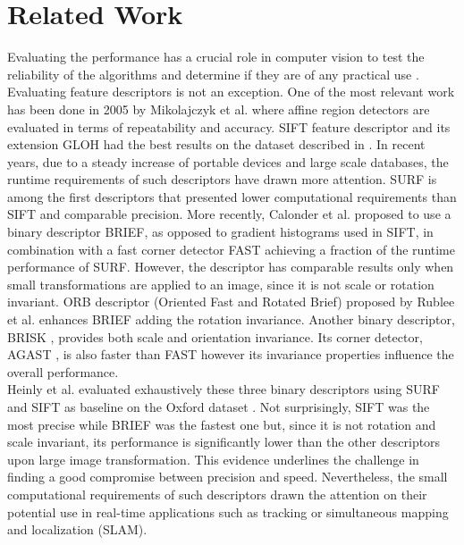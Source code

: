 \section{Related Work}
\label{sec:relatedwork}

Evaluating the performance has a crucial role in computer vision to test the reliability of the algorithms and determine if they are of any practical use \cite{christensen02,butler12,wu2013}. Evaluating feature descriptors is not an exception. One of the most relevant work has been done in 2005 by Mikolajczyk et al. \cite{mikolajczyk05} where affine region detectors are evaluated in terms of repeatability and accuracy. SIFT feature descriptor \cite{lowe04} and its extension GLOH \cite{mikolajczyk05} had the best results on the dataset described in \cite{mikolajczyk2005b}. In recent years, due to a steady increase of portable devices and large scale databases, the runtime requirements of such descriptors have drawn more attention. SURF \cite{bay2008} is among the first descriptors that presented lower computational requirements than SIFT and comparable precision. More recently, Calonder et al. \cite{calonder10} proposed to use a binary descriptor BRIEF, as opposed to gradient histograms used in SIFT, in combination with a fast corner detector FAST \cite{rosten06} achieving a fraction of the runtime performance of SURF. However, the descriptor has comparable results only when small transformations are applied to an image, since it is not scale or rotation invariant. ORB descriptor (Oriented Fast and Rotated Brief) proposed by Rublee et al. \cite{rublee11} enhances BRIEF adding the rotation invariance. Another binary descriptor, BRISK \cite{leutenegger11}, provides both scale and orientation invariance. Its corner detector, AGAST \cite{mair2010} , is also faster than FAST however its invariance properties influence the overall performance.\\ 
Heinly et al. \cite{heinly2012} evaluated exhaustively these three binary descriptors using SURF and SIFT as baseline on the Oxford dataset \cite{mikolajczyk2005b}. Not surprisingly, SIFT was the most precise while BRIEF was the fastest one but, since it is not rotation and scale invariant, its performance is significantly lower than the other descriptors upon large image transformation. This evidence underlines the challenge in finding a good compromise between precision and speed. Nevertheless, the small computational requirements of such descriptors drawn the attention on their potential use in real-time applications such as tracking or simultaneous mapping and localization (SLAM). \\
